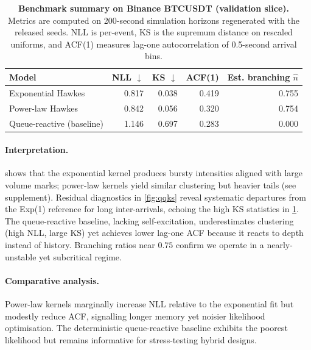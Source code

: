 \documentclass[11pt]{article}
\newcommand{\1}{\mathbbm{1}}
\begin{document}
\begin{table}[t]
  \centering\small
  \begin{tabular}{lrrrr}
    \toprule
    Model & NLL $\downarrow$ & KS $\downarrow$ & ACF(1) & Est. branching $\hat{n}$ \\
    \midrule
    Exponential Hawkes              & 0.817 & 0.038 & 0.419 & 0.755 \\
    Power-law Hawkes               & 0.842 & 0.056 & 0.320 & 0.754 \\
    Queue-reactive (baseline)      & 1.146 & 0.697 & 0.283 & 0.000 \\
    \bottomrule
  \end{tabular}
  \caption{\textbf{Benchmark summary on Binance BTCUSDT (validation slice).} Metrics are computed on 200-second simulation horizons regenerated with the released seeds. NLL is per-event, KS is the supremum distance on rescaled uniforms, and ACF(1) measures lag-one autocorrelation of 0.5-second arrival bins.}
  \label{tab:benchmarks}
\end{table}

\paragraph{Interpretation.}  shows that the exponential kernel produces bursty intensities aligned with large volume marks; power-law kernels yield similar clustering but heavier tails (see supplement). Residual diagnostics in \cref{fig:qqks} reveal systematic departures from the Exp(1) reference for long inter-arrivals, echoing the high KS statistics in \cref{tab:benchmarks}. The queue-reactive baseline, lacking self-excitation, underestimates clustering (high NLL, large KS) yet achieves lower lag-one ACF because it reacts to depth instead of history. Branching ratios near $0.75$ confirm we operate in a nearly-unstable yet subcritical regime.

\paragraph{Comparative analysis.} Power-law kernels marginally increase NLL relative to the exponential fit but modestly reduce ACF, signalling longer memory yet noisier likelihood optimisation. The deterministic queue-reactive baseline exhibits the poorest likelihood but remains informative for stress-testing hybrid designs.
\end{document}
